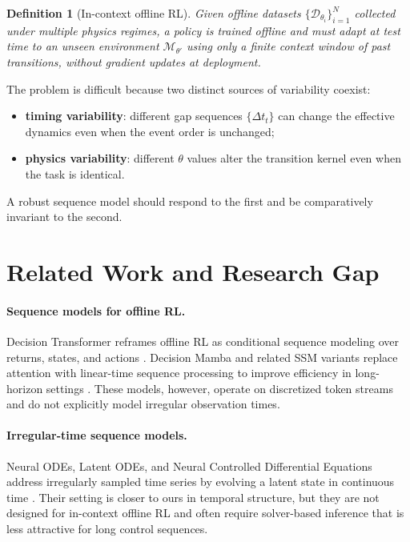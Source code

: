 \documentclass[11pt]{article}
\newtheorem{definition}[theorem]{Definition}
\newcommand{\cM}{\mathcal{M}}
\newcommand{\cD}{\mathcal{D}}
\newcommand{\dt}{\Delta t}
\newcommand{\phys}{\theta}
\begin{document}
\begin{definition}[In-context offline RL]
Given offline datasets $\{\cD_{\phys_i}\}_{i=1}^{N}$ collected under multiple physics regimes, a policy is trained offline and must adapt at test time to an unseen environment $\cM_{\phys'}$ using only a finite context window of past transitions, without gradient updates at deployment.
\end{definition}

The problem is difficult because two distinct sources of variability coexist:
\begin{itemize}
    \item \textbf{timing variability}: different gap sequences $\{\dt_t\}$ can change the effective dynamics even when the event order is unchanged;
    \item \textbf{physics variability}: different $\phys$ values alter the transition kernel even when the task is identical.
\end{itemize}

A robust sequence model should respond to the first and be comparatively invariant to the second.

\section{Related Work and Research Gap}

\paragraph{Sequence models for offline RL.}
Decision Transformer reframes offline RL as conditional sequence modeling over returns, states, and actions \cite{chen2021dt}. Decision Mamba and related SSM variants replace attention with linear-time sequence processing to improve efficiency in long-horizon settings \cite{huang2024dmh}. These models, however, operate on discretized token streams and do not explicitly model irregular observation times.

\paragraph{Irregular-time sequence models.}
Neural ODEs, Latent ODEs, and Neural Controlled Differential Equations address irregularly sampled time series by evolving a latent state in continuous time \cite{chen2018node, rubanova2019latent, kidger2020ncde}. Their setting is closer to ours in temporal structure, but they are not designed for in-context offline RL and often require solver-based inference that is less attractive for long control sequences.
\end{document}
